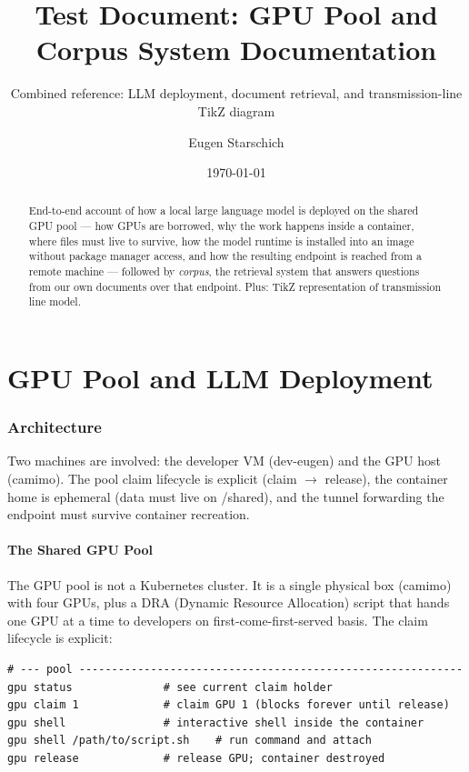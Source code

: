 \documentclass[11pt,a4paper]{article}
\title{Test Document: GPU Pool and Corpus System Documentation}
\subtitle{Combined reference: LLM deployment, document retrieval, and transmission-line TikZ diagram}
\author{Eugen Starschich}
\date{\today}
\begin{document}
\maketitle

\begin{abstract}
End-to-end account of how a local large language model is deployed on the shared
GPU pool --- how GPUs are borrowed, why the work happens inside a container, where
files must live to survive, how the model runtime is installed into an image
without package manager access, and how the resulting endpoint is reached from a
remote machine --- followed by \textit{corpus}, the retrieval
system that answers questions from our own documents over that endpoint.
Plus: TikZ representation of transmission line model.
\end{abstract}

\tableofcontents
\newpage


\part{GPU Pool and LLM Deployment}

\section{Architecture}
\label{sec:architecture}

Two machines are involved: the developer VM (dev-eugen) and the GPU host
(camimo). The pool claim lifecycle is explicit (claim $\rightarrow$ release), the
container home is ephemeral (data must live on /shared), and the tunnel
forwarding the endpoint must survive container recreation.

\subsection{The Shared GPU Pool}

The GPU pool is not a Kubernetes cluster. It is a single physical box
(camimo) with four GPUs, plus a DRA (Dynamic Resource Allocation) script
that hands one GPU at a time to developers on first-come-first-served basis. The claim lifecycle is explicit:

\begin{lstlisting}
# --- pool -----------------------------------------------------------
gpu status              # see current claim holder
gpu claim 1             # claim GPU 1 (blocks forever until release)
gpu shell               # interactive shell inside the container
gpu shell /path/to/script.sh    # run command and attach
gpu release             # release GPU; container destroyed
\end{lstlisting}
\end{document}
